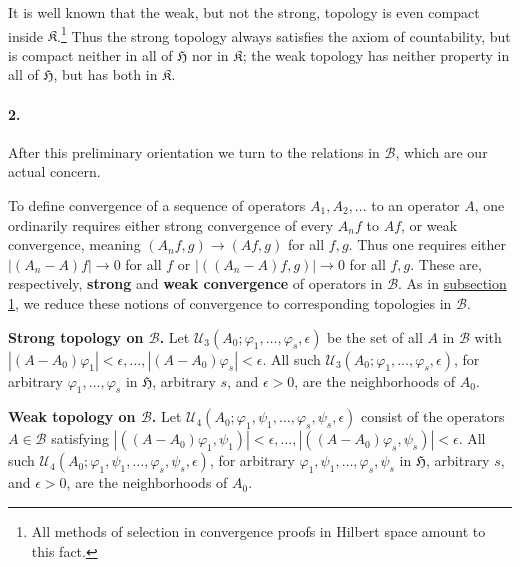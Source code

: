 \documentclass[
  paper=b5,
  twoside=true,
  fontsize=13pt,
  headings=normal,
  bookmarkpackage=false
]{scrartcl}
\theoremstyle{definition}
\begin{document}
It is well known that the weak, but not the strong, topology is even compact
inside $\mathfrak{K}$.\footnote{\label{fn:34}All methods of selection in convergence
proofs in Hilbert space amount to this fact.} Thus the strong topology
always satisfies the axiom of countability, but is compact neither in all
of $\mathfrak H$ nor in $\mathfrak{K}$; the weak topology has neither
property in all of $\mathfrak H$, but has both in $\mathfrak{K}$.

\paragraph*{2.}\label{sec:topologies-2}
After this preliminary orientation we turn to the relations in $\mathcal B$, which are our actual concern.

To define convergence of a sequence of operators $A_1,A_2,\ldots$ to an
operator $A$, one ordinarily requires either strong convergence of every $A_nf$ to $Af$, or weak convergence, meaning $(A_nf,g)\to(Af,g)$ for all $f,g$.
Thus one requires either $|(A_n-A)f|\to0$ for all $f$ or $|((A_n-A)f,g)|\to0$
for all $f,g$. These are, respectively, \textbf{strong} and \textbf{weak
convergence} of operators in $\mathcal B$. As in \hyperref[sec:topologies-1]{subsection 1}, we reduce
these notions of convergence to corresponding topologies in $\mathcal B$.

\medskip
\noindent\textbf{Strong topology on $\mathcal B$.}
Let $\mathcal U_3(A_0;\varphi_1,\ldots,\varphi_s,\epsilon)$ be the set of all $A$ in $\mathcal B$ with $|(A-A_0)\varphi_1|<\epsilon,\ldots,
|(A-A_0)\varphi_s|<\epsilon$. All such $\mathcal U_3(A_0;\varphi_1,\ldots,\varphi_s,\epsilon)$,
for arbitrary $\varphi_1,\ldots,\varphi_s$ in $\mathfrak H$, arbitrary $s$,
and $\epsilon>0$, are the neighborhoods of $A_0$.

\medskip
\noindent\textbf{Weak topology on $\mathcal B$.}
Let $\mathcal U_4(A_0;\varphi_1,\psi_1,\ldots,\varphi_s,\psi_s,\epsilon)$
consist of the operators $A\in\mathcal B$ satisfying $|((A-A_0)\varphi_1,\psi_1)|<\epsilon,\ldots,|((A-A_0)\varphi_s,\psi_s)|<\epsilon$.
All such $\mathcal U_4(A_0;\varphi_1,\psi_1,\ldots,\varphi_s,\psi_s,\epsilon)$,
for arbitrary $\varphi_1,\psi_1,\ldots,\varphi_s,\psi_s$ in $\mathfrak H$,
arbitrary $s$, and $\epsilon>0$, are the neighborhoods of $A_0$.
\end{document}
